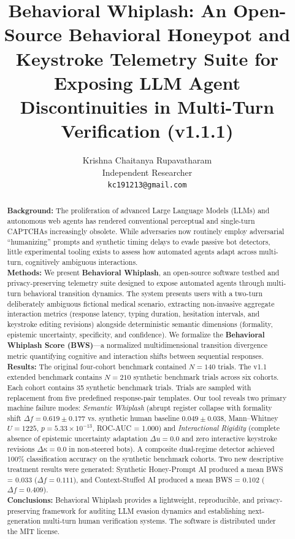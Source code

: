 \documentclass[10pt,a4paper]{article}
\title{\textbf{Behavioral Whiplash: An Open-Source Behavioral Honeypot and Keystroke Telemetry Suite for Exposing LLM Agent Discontinuities in Multi-Turn Verification (v1.1.1)}}
\author{
    Krishna Chaitanya Rupavatharam\\
    \small Independent Researcher\\
    \small \texttt{kc191213@gmail.com}
}
\date{}
\begin{document}
\maketitle

\begin{abstract}
\noindent\textbf{Background:} The proliferation of advanced Large Language Models (LLMs) and autonomous web agents has rendered conventional perceptual and single-turn CAPTCHAs increasingly obsolete. While adversaries now routinely employ adversarial ``humanizing'' prompts and synthetic timing delays to evade passive bot detectors, little experimental tooling exists to assess how automated agents adapt across multi-turn, cognitively ambiguous interactions.\\
\textbf{Methods:} We present \textbf{Behavioral Whiplash}, an open-source software testbed and privacy-preserving telemetry suite designed to expose automated agents through multi-turn behavioral transition dynamics. The system presents users with a two-turn deliberately ambiguous fictional medical scenario, extracting non-invasive aggregate interaction metrics (response latency, typing duration, hesitation intervals, and keystroke editing revisions) alongside deterministic semantic dimensions (formality, epistemic uncertainty, specificity, and confidence). We formalize the \textbf{Behavioral Whiplash Score (BWS)}---a normalized multidimensional transition divergence metric quantifying cognitive and interaction shifts between sequential responses.\\
\textbf{Results:} The original four-cohort benchmark contained $N=140$ trials. The v1.1 extended benchmark contains $N=210$ synthetic benchmark trials across six cohorts. Each cohort contains 35 synthetic benchmark trials. Trials are sampled with replacement from five predefined response-pair templates. Our tool reveals two primary machine failure modes: \textit{Semantic Whiplash} (abrupt register collapse with formality shift $\Delta f = 0.619 \pm 0.177$ vs. synthetic human baseline $0.049 \pm 0.038$, Mann--Whitney $U=1225$, $p=5.33 \times 10^{-13}$, ROC-AUC = 1.000) and \textit{Interactional Rigidity} (complete absence of epistemic uncertainty adaptation $\Delta u = 0.0$ and zero interactive keystroke revisions $\Delta \kappa = 0.0$ in non-steered bots). A composite dual-regime detector achieved 100\% classification accuracy on the synthetic benchmark cohorts. Two new descriptive treatment results were generated: Synthetic Honey-Prompt AI produced a mean BWS = 0.033 ($\Delta f = 0.111$), and Context-Stuffed AI produced a mean BWS = 0.102 ($\Delta f = 0.409$).\\
\textbf{Conclusions:} Behavioral Whiplash provides a lightweight, reproducible, and privacy-preserving framework for auditing LLM evasion dynamics and establishing next-generation multi-turn human verification systems. The software is distributed under the MIT license.
\end{abstract}
\end{document}
